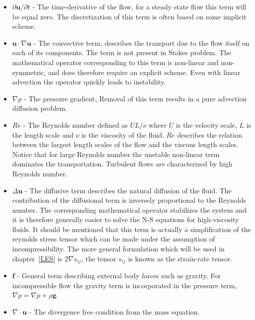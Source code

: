 \begin{itemize}
    \item $\partial \mathbf{u} /\partial t$
     - The time-derivative of the flow, for a steady state flow this term will be equal zero.
             The discretization of this term is often based on some implicit scheme. 
    \item $\mathbf{u} \cdot \nabla \mathbf{u}$
     - The convective term, describes the transport due to the flow itself on each of its components. 
    The term is not present in Stokes problem.
    The mathematical operator corresponding to this term is non-linear and non-symmetric, and does therefore require an explicit scheme. 
    Even with linear advection the operator quickly leads to instability. 

    \item $\nabla p$
    - The pressure gradient, Removal of this term results in a pure advection diffusion problem.

    \item $Re$ 
    - The Reynolds number defined as $UL/\nu$ where $U$ is the velocity scale, $L$ is the length scale and $\nu$ 
      is the viscosity of the fluid. $Re$ describes the relation between the largest length scales of the flow
      and the viscous length scales. Notice that for large Reynolds number the unstable non-linear term 
      dominates the transportation. Turbulent flows are characterized by high Reynolds number.

    \item $\Delta \mathbf{u}$ 
    - The diffusive term describes the natural diffusion of the fluid. The contribution of the diffusional term 
    is inversely proportional to the Reynolds number.
    The corresponding mathematical operator stabilizes the system and it is therefore generally easier
    to solve the N-S equations for high-viscosity fluids. It should be mentioned that this term is actually a simplification 
    of the reynolds stress tensor which can be made under the assumption of incompressibility. The more general formulation which 
    will be used in chapter~\ref{LES} is $2 \nabla s_{ij}$, the tensor $s_{ij}$ is known as the strain-rate tensor. 

\item $\mathbf{f}$ 
    - General term describing external body forces such as gravity. For incompressible flow the
    gravity term is incorporated in the pressure term, $\nabla p = \nabla p + \rho \mathbf{g}$. 

    \item $\nabla \cdot \mathbf{u}$ 
    - The divergence free condition from the mass equation.
\end{itemize}

